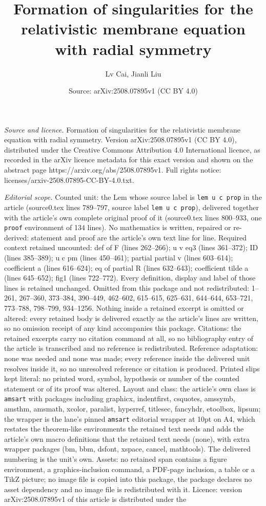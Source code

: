 \documentclass[10pt,a4paper]{amsart}
\title[Formation of singularities for the relativistic membrane equ]{Formation of singularities for the relativistic membrane equation with radial symmetry}
\author{Lv Cai, Jianli Liu}
\date{Source: arXiv:2508.07895v1 (CC BY 4.0)}
\begin{document}
\maketitle

\noindent\emph{Source and licence.} Formation of singularities for the relativistic membrane equation with radial symmetry. Version arXiv:2508.07895v1 (CC BY 4.0), distributed under the Creative Commons Attribution 4.0 International licence, as recorded in the arXiv licence metadata for this exact version and shown on the abstract page https://arxiv.org/abs/2508.07895v1. Full rights notice: licenses/arxiv-2508.07895-CC-BY-4.0.txt.\par\smallskip

\noindent\textit{Editorial scope.} Counted unit: the Lem whose source label is \texttt{lem u c prop} in the article (source0.tex lines 789--797, source label \texttt{lem u c prop}), delivered together with the article's own complete original proof of it (source0.tex lines 800--933, one \texttt{proof} environment of 134 lines). No mathematics is written, repaired or re-derived: statement and proof are the article's own text line for line. Required context retained uncounted: def of F (lines 262--266); u v eq3 (lines 361--372); ID (lines 385--389); u c pm (lines 450--461); partial partial v (lines 603--614); coefficient a (lines 616--624); eq of partial R (lines 632--643); coefficient tilde a (lines 645--652); fig1 (lines 722--772). Every definition, display and label of those lines is retained unchanged. Omitted from this package and not redistributed: 1--261, 267--360, 373--384, 390--449, 462--602, 615--615, 625--631, 644--644, 653--721, 773--788, 798--799, 934--1256. Nothing inside a retained excerpt is omitted or altered: every retained body is delivered exactly as the article's lines are written, so no omission receipt of any kind accompanies this package. Citations: the retained excerpts carry no citation command at all, so no bibliography entry of the article is transcribed and no reference is redistributed. Reference adaptation: none was needed and none was made; every reference inside the delivered unit resolves inside it, so no unresolved reference or citation is produced. Printed slips kept literal: no printed word, symbol, hypothesis or number of the counted statement or of its proof was altered. Layout and class: the article's own class is \texttt{amsart} with packages including graphicx, indentfirst, csquotes, amssymb, amsthm, amsmath, xcolor, paralist, hyperref, titlesec, fancyhdr, etoolbox, lipsum; the wrapper is the lane's pinned \texttt{amsart} editorial wrapper at 10pt on A4, which restates the theorem-like environments the retained text needs and adds the article's own macro definitions that the retained text needs (none), with extra wrapper packages (bm, bbm, dsfont, xspace, cancel, mathtools). The delivered numbering is the unit's own. Assets: no retained span contains a figure environment, a graphics-inclusion command, a PDF-page inclusion, a table or a TikZ picture; no image file is copied into this package, the package declares no asset dependency and no image file is redistributed with it. Licence: version arXiv:2508.07895v1 of this article is distributed under the 
\end{document}
